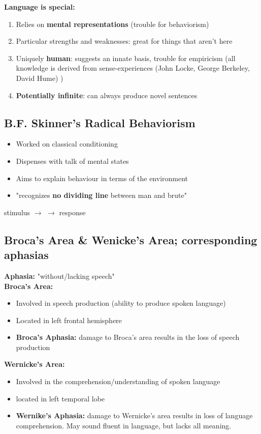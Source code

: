 \documentclass{article}
\begin{document}
\textbf{Language is special:}
\begin{enumerate}
    \item Relies on \textbf{mental representations} (trouble for behaviorism) 
    \item Particular strengths and weaknesses: great for things that aren't here
    \item Uniquely \textbf{human}: suggests an innate basis, trouble for empiricism (all knowledge is derived from sense-experiences (John Locke, George Berkeley, David Hume) )
    \item \textbf{Potentially infinite}: can always produce novel sentences
\end{enumerate}

\subsection{B.F. Skinner's Radical Behaviorism}
\begin{itemize}
    \item Worked on classical conditioning 
    \item Dispenses with talk of mental states
    \item Aims to explain behaviour in terms of the environment
    \item "recognizes \textbf{no dividing line} between man and brute"
\end{itemize}
 
stimulus $\rightarrow$  $\rightarrow$ response

\subsection{Broca's Area \& Wenicke's Area; corresponding aphasias}
 
\textbf{Aphasia:} "without/lacking speech" \\
 
\noindent \textbf{Broca's Area:}
\begin{itemize}
    \item Involved in speech production (ability to produce spoken language) 
    \item Located in left frontal hemisphere
    \item \textbf{Broca's Aphasia:} damage to Broca's area results in the loss of speech production
\end{itemize}
 
\noindent \textbf{Wernicke's Area:}
\begin{itemize}
    \item Involved in the comprehension/understanding of spoken language
    \item located in left temporal lobe 
    \item \textbf{Wernike's Aphasia:} damage to Wernicke's area results in loss of language comprehension. May sound fluent in language, but lacks all meaning. 
\end{itemize}
\end{document}
